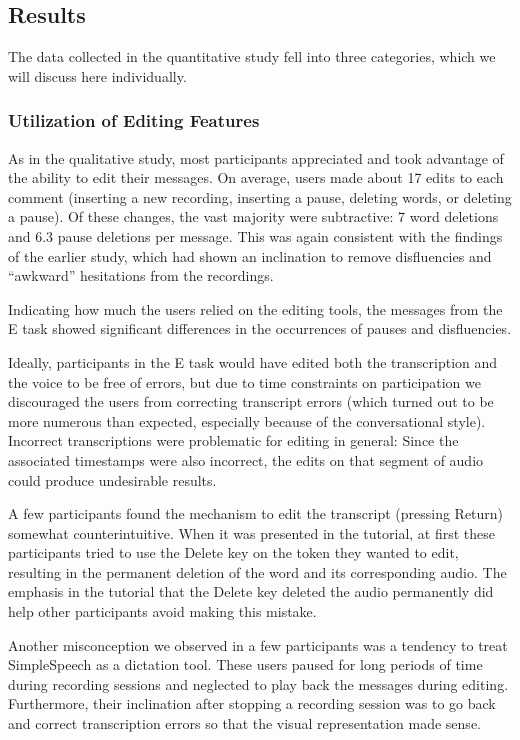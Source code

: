 \subsection{Results}
The data collected in the quantitative study fell into three categories, which we will discuss here individually.

\subsubsection{Utilization of Editing Features}
As in the qualitative study, most participants appreciated and took advantage of the ability to edit their messages.
On average, users made about 17 edits to each comment (inserting a new recording, inserting a pause, deleting words, or deleting a pause). 
Of these changes, the vast majority were subtractive: 7 word deletions and 6.3 pause deletions per message.
This was again consistent with the findings of the earlier study, which had shown an inclination to remove disfluencies and ``awkward'' hesitations from the recordings.

Indicating how much the users relied on the editing tools, the messages from the E task showed significant differences in the occurrences of pauses and disfluencies. 

Ideally, participants in the E task would have edited both the transcription and the voice to be free of errors, but due to time constraints on participation we discouraged the users from correcting transcript errors (which turned out to be more numerous than expected, especially because of the conversational style).
Incorrect transcriptions were problematic for editing in general: Since the associated timestamps were also incorrect, the edits on that segment of audio could produce undesirable results. 

A few participants found the mechanism to edit the transcript (pressing Return) somewhat counterintuitive. 
When it was presented in the tutorial, at first these participants tried to use the Delete key on the token they wanted to edit, resulting in the permanent deletion of the word and its corresponding audio. 
The emphasis in the tutorial that the Delete key deleted the audio permanently did help other participants avoid making this mistake.

Another misconception we observed in a few participants was a tendency to treat SimpleSpeech as a dictation tool. 
These users paused for long periods of time during recording sessions and neglected to play back the messages during editing. 
Furthermore, their inclination after stopping a recording session was to go back and correct transcription errors so that the visual representation made sense.

